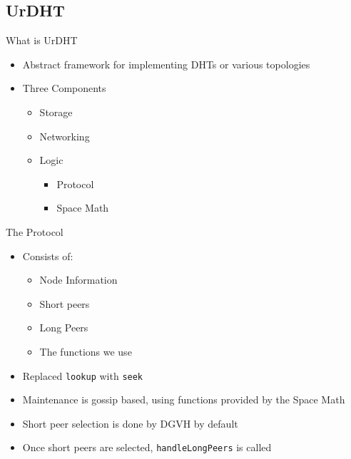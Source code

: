 \documentclass[11pt]{beamer}
\begin{document}
\subsection{UrDHT}

\begin{frame}{What is UrDHT}
	\begin{itemize}
		\item Abstract framework for implementing DHTs or various topologies
		\item Three Components
		\begin{itemize}
			\item Storage 
			\item Networking
			\item Logic
			\begin{itemize}
				\item Protocol
				\item Space Math
			\end{itemize}
		\end{itemize}
	\end{itemize}
\end{frame}



\begin{frame}{The Protocol}

	\begin{itemize}
		\item Consists of:
		\begin{itemize}
			\item Node Information
			\item Short peers
			\item Long Peers
			\item The functions we use
		\end{itemize}
		\item Replaced \texttt{lookup} with \texttt{seek}
		\item Maintenance is gossip based, using functions provided by the Space Math
		\item Short peer selection is done by DGVH by default
		\item Once short peers are selected, \texttt{handleLongPeers} is called
	\end{itemize}
\end{frame}
\end{document}
